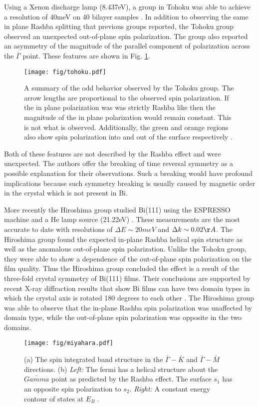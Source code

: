 \documentclass[12pt]{article}
\begin{document}
Using a Xenon discharge lamp (8.437eV), a group in Tohoku was able to achieve a resolution of 40meV on 40 bilayer samples \cite{Takayama}.
In addition to observing the same in plane Rashba splitting that previous groups reported, the Tohoku group observed an unexpected out-of-plane spin polarization.
The group also reported an asymmetry of the magnitude of the parallel component of polarization across the $\bar{\Gamma}$ point.
These features are shown in Fig. \ref{fig:tohoku}.
\begin{figure}[h]
  \centering
  \texttt{[image: fig/tohoku.pdf]}
  \caption{A summary of the odd behavior observed by the Tohoku group.  The arrow lengths are proportional to the observed spin polarization.  If the in plane polarization was was strictly Rashba like then the magnitude of the in plane polarization would remain constant.  This is not what is observed.  Additionally, the green and orange regions also show spin polarization into and out of the surface respectively \cite{Takayama}.}
  \label{fig:tohoku}
\end{figure}
Both of these features are not described by the Rashba effect and were unexpected.
The authors offer the breaking of time reversal symmetry as a possible explanation for their observations.
Such a breaking would have profound implications because such symmetry breaking is usually caused by magnetic order in the crystal which is not present in Bi.

More recently the Hiroshima group studied Bi(111) using the ESPRESSO machine and a He lamp source (21.22eV) \cite{Miyahara}.
These measurements are the most accurate to date with resolutions of $\Delta E\sim20meV$ and $\Delta k\sim0.02\AA$.
The Hiroshima group found the expected in-plane Rashba helical spin structure as well as the anomalous out-of-plane spin polarization.
Unlike the Tohoku group, they were able to show a dependence of the out-of-plane spin polarization on the film quality.
Thus the Hiroshima group concluded the effect is a result of the three-fold crystal symmetry of Bi(111) films.
Their conclusions are supported by recent X-ray diffraction results that show Bi films can have two domain types in which the crystal axis is rotated 180 degrees to each other \cite{Shirasawa}.
The Hiroshima group was able to observe that the in-plane Rashba spin polarization was unaffected by domain type, while the out-of-plane spin polarization was opposite in the two domains.
\begin{figure}[th]
  \centering
  \texttt{[image: fig/miyahara.pdf]}
  \caption{(a) The spin integrated band structure in the $\bar{\Gamma}-\bar{K}$ and $\bar{\Gamma}-\bar{M}$ directions.  (b) \textit{Left:}  The fermi has a helical structure about the $\bar{Gamma}$ point as predicted by the Rashba effect.  The surface $s_1$ has an opposite spin polarization to $s_2$.  \textit{Right:} A constant energy contour of states at $E_B$ \cite{Miyahara}.}
  \label{fig:miyahara}
\end{figure}
\end{document}
